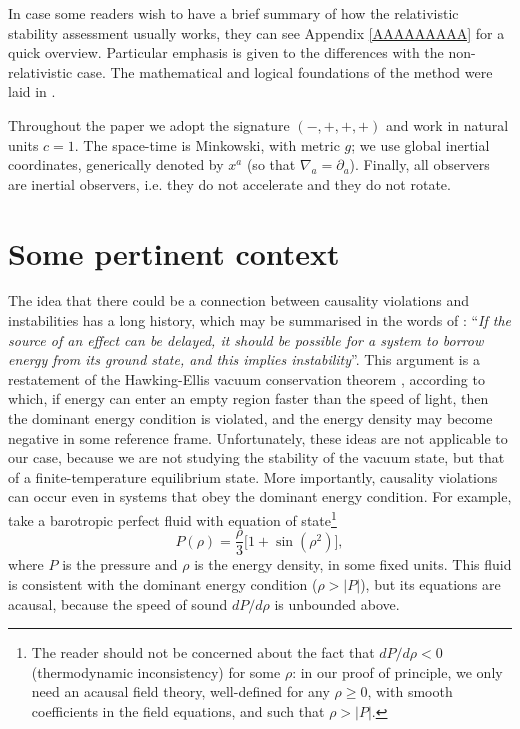 \documentclass[a4paper, amsfonts, amssymb, amsmath, reprint, showkeys,  twoside, onecolumn,notitlepage,nofootinbib]{revtex4-1}
\theoremstyle{definition}
\theoremstyle{theorem}
\begin{document}
In case some readers wish to have a brief summary of how the relativistic stability assessment usually works, they can see Appendix \ref{AAAAAAAAA} for a quick overview.
Particular emphasis is given to the differences with the non-relativistic case. The mathematical and logical foundations of the method were laid in \cite{Hiscock_Insatibility_first_order}.

Throughout the paper we adopt the signature $ ( - , +, + , + ) $ and work in natural units $c=1$. The space-time is Minkowski, with metric $g$; we use global inertial coordinates, generically denoted by $x^a$ (so that $\nabla_a=\partial_a$). Finally, all observers are inertial observers, i.e. they do not accelerate and they do not rotate.





\section{Some pertinent context}

The idea that there could be a connection between causality violations and instabilities has a long history, which may be summarised in the words of \citet{Israel_2009_inbook}: ``\textit{If the source of an effect can be delayed, it should be possible for a system to borrow energy from its ground state, and this implies instability}''. This argument is a restatement of the Hawking-Ellis vacuum conservation theorem \cite{Hawking1973}, according to which, if energy can enter an empty region faster than the speed of light, then the dominant energy condition is violated, and the energy density may become negative in some reference frame. Unfortunately, these ideas are not applicable to our case, because we are not studying the stability of the vacuum state, but that of a finite-temperature equilibrium state. More importantly, causality violations can occur even in systems that obey the dominant energy condition. For example, take a barotropic perfect fluid with equation of state\footnote{The reader should not be concerned about the fact that $dP/d\rho <0$ (thermodynamic inconsistency) for some $\rho$: in our proof of principle, we only need an acausal field theory, well-defined for any $\rho \geq 0 $, with smooth coefficients in the field equations, and such that $\rho >|P|$.}
\begin{equation}\label{prruz}
P(\rho) = \dfrac{\rho}{3} \big[1+ \sin(\rho^2) \big],
\end{equation}
where $P$ is the pressure and $\rho$ is the energy density, in some fixed units. This fluid is consistent with the dominant energy condition ($\rho>|P|$), but its equations are acausal, because the speed of sound $dP/d\rho$ is unbounded above.
\end{document}
